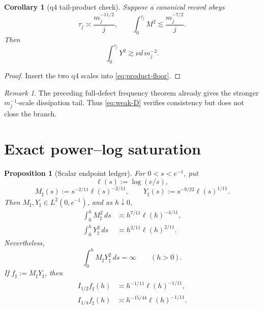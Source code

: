 \documentclass[11pt]{article}
\newtheorem{proposition}[theorem]{Proposition}
\newtheorem{corollary}[theorem]{Corollary}
\theoremstyle{remark}
\newtheorem{remark}[theorem]{Remark}
\begin{document}
\begin{corollary}[q4 tail-product check]
\label{cor:q4-tail}
Suppose a canonical record obeys
\[
 \tau_j\asymp\frac{m_j^{-11/2}}j,
 \qquad
 \int_0^{\tau_j}M^2
 \lesssim\frac{m_j^{-7/2}}j.
\]
Then
\begin{equation}
\label{eq:weak-D}
 \int_0^{\tau_j}Y^2
 \gtrsim\nu d\,m_j^{-2}.
\end{equation}
\end{corollary}

\begin{proof}
Insert the two q4 scales into \eqref{eq:product-floor}.
\end{proof}

\begin{remark}
The preceding full-defect frequency theorem already gives the stronger
\(m_j^{-1}\)-scale dissipation tail.  Thus
\eqref{eq:weak-D} verifies consistency but does not close the branch.
\end{remark}

\section{Exact power--log saturation}

\begin{proposition}[Scalar endpoint ledger]
\label{prop:ledger}
For \(0<s<e^{-1}\), put
\[
 \ell(s):=\log(e/s),
\]
\begin{equation}
\label{eq:sharp-MY}
 M_\sharp(s):=
 s^{-2/11}\ell(s)^{-2/11},
 \qquad
 Y_\sharp(s):=
 s^{-9/22}\ell(s)^{1/11}.
\end{equation}
Then \(M_\sharp,Y_\sharp\in L^2(0,e^{-1})\), and as
\(h\downarrow0\),
\begin{align}
\label{eq:M-tail}
 \int_0^hM_\sharp^2\,ds
 &\asymp h^{7/11}\ell(h)^{-4/11},\\
\label{eq:Y-tail}
 \int_0^hY_\sharp^2\,ds
 &\asymp h^{2/11}\ell(h)^{2/11}.
\end{align}
Nevertheless,
\begin{equation}
\label{eq:weighted-divergence}
 \int_0^hM_\sharp Y_\sharp^2\,ds=\infty
 \qquad(h>0).
\end{equation}
If \(f_\sharp:=M_\sharp Y_\sharp\), then
\begin{align}
\label{eq:Ihalf-sharp}
 I_{1/2}f_\sharp(h)
 &\asymp
 h^{-1/11}\ell(h)^{-1/11},\\
\label{eq:Iquarter-sharp}
 I_{1/4}f_\sharp(h)
 &\asymp
 h^{-15/44}\ell(h)^{-1/11}.
\end{align}
\end{proposition}
\end{document}
